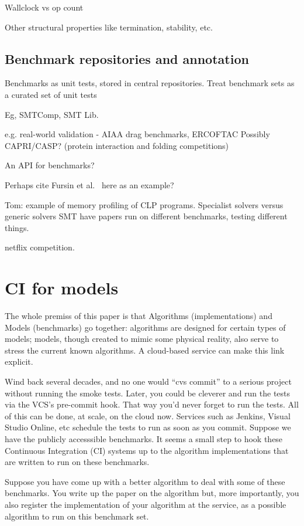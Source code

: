 \documentclass[conference]{IEEEtran}
\begin{document}
Wallclock vs op count

Other structural properties like termination, stability, etc. 

\subsection{Benchmark repositories and annotation}


Benchmarks as unit tests, stored in central repositories. 
Treat benchmark sets as a curated set of unit tests

Eg, SMTComp, SMT Lib. 

e.g. real-world validation - AIAA drag benchmarks, ERCOFTAC
	Possibly CAPRI/CASP? (protein interaction and folding competitions)

An API for benchmarks? 

Perhaps cite Fursin et al.~\cite{fursin-et-al:2014} here as an example?

Tom: 
example of memory profiling of CLP programs. Specialist solvers versus 
generic solvers SMT have papers run on different benchmarks, testing different 
things. 

netflix competition. 

\section{CI for models}


The whole premiss of this paper is that Algorithms (implementations)
and Models (benchmarks) go together: algorithms are designed for
certain types of models; models, though created to mimic some physical
reality, also serve to stress the current known algorithms. A
cloud-based service can make this link explicit.

Wind back several decades, and no one would ``cvs commit'' to a
serious project without running the smoke tests. Later, you could be
cleverer and run the tests via the VCS's pre-commit hook. That way
you'd never forget to run the tests. All of this can be done, at
scale, on the cloud now. Services such as Jenkins, Visual Studio
Online, etc schedule the tests to run as soon as you commit. Suppose
we have the publicly accesssible benchmarks. It seems a small step to
hook these Continuous Integration (CI) systems up to the algorithm
implementations that are written to run on these benchmarks.

Suppose you have come up with a better algorithm to deal with some of
these benchmarks. You write up the paper on the algorithm but, more
importantly, you also register the implementation of your algorithm at
the service, as a possible algorithm to run on this benchmark set.
\end{document}
